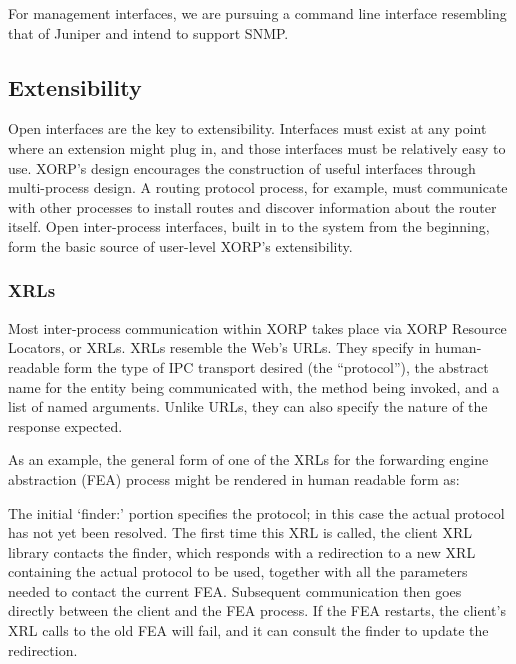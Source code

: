 For management interfaces, we are pursuing a command line interface
resembling that of Juniper and intend to support SNMP.


\subsection{Extensibility}

Open interfaces are the key to extensibility.
Interfaces must exist at any point where an extension might plug in,
and those interfaces must be relatively easy to use.
XORP's design encourages the construction of useful
interfaces through multi-process design.
A routing protocol process, for example, must communicate with other
processes to install routes and discover information about the router
itself.
Open inter-process interfaces, built in to the system from the beginning,
form the basic source of user-level XORP's extensibility.

\subsubsection{XRLs}
\def\xrl#1{\textsf{\small #1}}

Most inter-process communication within XORP takes place via XORP
Resource Locators, or XRLs.  XRLs resemble the Web's URLs. They specify in
human-readable form the type of IPC transport desired (the
``protocol''), the abstract name for the entity being communicated
with, the method being invoked, and a list of named arguments.  Unlike
URLs, they can also specify the nature of the response expected.

As an example, the general form of one of the XRLs for the forwarding
engine abstraction (FEA) process might be rendered in human readable
form as:
%
\begin{figure}[h]
\vspace{-0.05in}
\centerline{}
\vspace{-0.1in}
\end{figure}

\noindent The initial `\xrl{finder:}' portion specifies the protocol;
in this case the actual protocol has not yet been resolved.
The first time this XRL is called, the client XRL library
contacts the finder, which responds with a redirection to a new XRL
containing the actual protocol to be used, together with all the
parameters needed to contact the current FEA.
Subsequent communication then goes
directly between the client and the FEA process.
If the FEA restarts, the client's XRL calls to the old FEA will fail, and
it can consult the finder to update the redirection.

